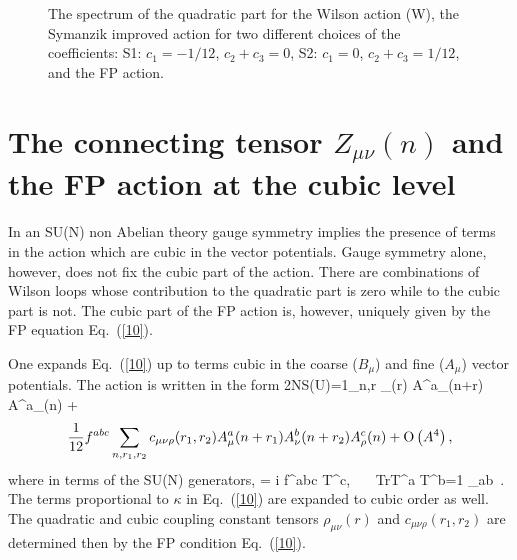  
\begin{figure}[htb]
\begin{center}
\leavevmode
\epsfxsize=100mm
\end{center}
\caption{The spectrum of the quadratic part for the Wilson action (W),
the Symanzik improved action for two different choices of the coefficients:
S1: $c_1=-1/12$, $c_2+c_3=0$, S2: $c_1=0$, $c_2+c_3=1/12$,
  and the FP action.}
\label{fig:spectrum}
\end{figure}


\section{The connecting tensor $Z_{\mu \nu}(n)$ and the FP action 
at the cubic level}

In an SU(N) non Abelian theory gauge symmetry implies the presence
of terms in the action which are cubic in the vector potentials.
Gauge symmetry alone, however, does not fix the cubic part of the action.
There are combinations of Wilson loops whose contribution to the 
quadratic part is zero while to the cubic part is not.
The cubic part of the FP action is, however, uniquely given by
the FP equation Eq.~(\ref{10}).

One expands Eq.~(\ref{10}) up to terms cubic in the coarse
($B_{\mu}$) and fine ($A_{\mu}$) vector potentials.
The action is written in the form 
\bee
2N\cdot S(U)={1}\sum_{n,r} \rho_{\mu \nu}(r) 
A^a_{\mu}(n+r) A^a_{\nu}(n) +
                                                                \label{23}
\ee
$$
{1\over 12} f^{abc} \sum_{n,r_1,r_2} c_{\mu \nu \rho}(r_1,r_2)
A^a_{\mu}(n+r_1) A^b_{\nu}(n+r_2) A^c_{\rho}(n) + 
{\rm O}\left( A^4 \right),
$$
where in terms of the SU(N) generators,
\bee
\left[ T^a, T^b \right] = i f^{abc} T^c,
~~~{\rm Tr}T^a T^b={1} \delta_{ab} \,.                  \label{24}
\ee
The terms proportional to $\kappa$ in Eq.~(\ref{10}) are expanded to
cubic order as well. The quadratic and cubic coupling constant
tensors $\rho_{\mu \nu}(r)$ and $c_{\mu\nu\rho}(r_1,r_2)$ are determined 
then by the FP condition Eq.~(\ref{10}). 

